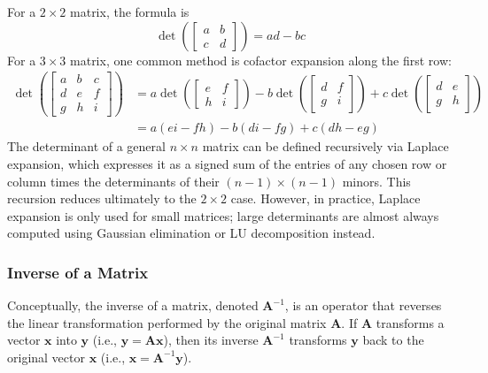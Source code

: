 For a $2\times 2$ matrix, the formula is
\begin{equation*}
    \det\!\left(\begin{bmatrix} a & b \\ c & d \end{bmatrix}\right) = ad - bc
\end{equation*}
For a $3\times 3$ matrix, one common method is cofactor expansion along the first row:
\begin{align*}
    \det\!\left(\begin{bmatrix} a & b & c \\ d & e & f \\ g & h & i \end{bmatrix}\right) &= a \det\!\left(\begin{bmatrix} e & f \\ h & i \end{bmatrix}\right) - b \det\!\left(\begin{bmatrix} d & f \\ g & i \end{bmatrix}\right) + c \det\!\left(\begin{bmatrix} d & e \\ g & h \end{bmatrix}\right) \\ &= a(ei - fh) - b(di - fg) + c(dh - eg)
\end{align*}
The determinant of a general $n \times n$ matrix can be defined recursively via Laplace expansion, which expresses it as a signed sum of the entries of any chosen row or column times the determinants of their $(n-1) \times (n-1)$ minors. This recursion reduces ultimately to the $2 \times 2$ case. However, in practice, Laplace expansion is only used for small matrices; large determinants are almost always computed using Gaussian elimination or LU decomposition instead.


\subsubsection{Inverse of a Matrix}
Conceptually, the inverse of a matrix, denoted $ \mathbf{A}^{-1} $, is an operator that reverses the linear transformation performed by the original matrix $ \mathbf{A} $. If $ \mathbf{A} $ transforms a vector $ \mathbf{x} $ into $ \mathbf{y} $ (i.e., $ \mathbf{y} = \mathbf{A}\mathbf{x} $), then its inverse $ \mathbf{A}^{-1} $ transforms $ \mathbf{y} $ back to the original vector $ \mathbf{x} $ (i.e., $ \mathbf{x} = \mathbf{A}^{-1}\mathbf{y} $).

